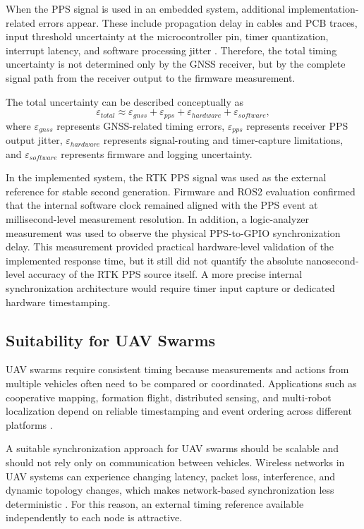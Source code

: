 When the PPS signal is used in an embedded system, additional implementation-related errors appear. These include propagation delay in cables and PCB traces, input threshold uncertainty at the microcontroller pin, timer quantization, interrupt latency, and software processing jitter \cite{kopetz2011realtime}. Therefore, the total timing uncertainty is not determined only by the GNSS receiver, but by the complete signal path from the receiver output to the firmware measurement.

The total uncertainty can be described conceptually as
\begin{equation}
\varepsilon_{total} \approx \varepsilon_{gnss} + \varepsilon_{pps} + \varepsilon_{hardware} + \varepsilon_{software},
\end{equation}
where $\varepsilon_{gnss}$ represents GNSS-related timing errors, $\varepsilon_{pps}$ represents receiver PPS output jitter, $\varepsilon_{hardware}$ represents signal-routing and timer-capture limitations, and $\varepsilon_{software}$ represents firmware and logging uncertainty.

In the implemented system, the RTK PPS signal was used as the external reference for stable second generation. Firmware and ROS2 evaluation confirmed that the internal software clock remained aligned with the PPS event at millisecond-level measurement resolution. In addition, a logic-analyzer measurement was used to observe the physical PPS-to-GPIO synchronization delay. This measurement provided practical hardware-level validation of the implemented response time, but it still did not quantify the absolute nanosecond-level accuracy of the RTK PPS source itself. A more precise internal synchronization architecture would require timer input capture or dedicated hardware timestamping.

\subsection{Suitability for UAV Swarms}

UAV swarms require consistent timing because measurements and actions from multiple vehicles often need to be compared or coordinated. Applications such as cooperative mapping, formation flight, distributed sensing, and multi-robot localization depend on reliable timestamping and event ordering across different platforms \cite{r1,r2,r7}.

A suitable synchronization approach for UAV swarms should be scalable and should not rely only on communication between vehicles. Wireless networks in UAV systems can experience changing latency, packet loss, interference, and dynamic topology changes, which makes network-based synchronization less deterministic \cite{lopez2021uavmesh}. For this reason, an external timing reference available independently to each node is attractive.

